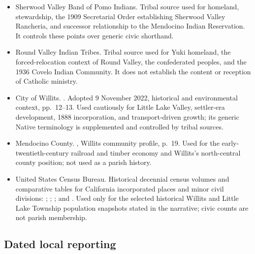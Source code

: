 \begin{itemize}[leftmargin=1.35em,itemsep=0.2em,topsep=0.2em]
\item Sherwood Valley Band of Pomo Indians.  Tribal source used for homeland, stewardship, the 1909 Secretarial Order establishing Sherwood Valley Rancheria, and successor relationship to the Mendocino Indian Reservation. It controls these points over generic civic shorthand.
\item Round Valley Indian Tribes.  Tribal source used for Yuki homeland, the forced-relocation context of Round Valley, the confederated peoples, and the 1936 Covelo Indian Community. It does not establish the content or reception of Catholic ministry.
\item City of Willits. . Adopted 9 November 2022, historical and environmental context, pp.~12--13. Used cautiously for Little Lake Valley, settler-era development, 1888 incorporation, and transport-driven growth; its generic Native terminology is supplemented and controlled by tribal sources.
\item Mendocino County. , Willits community profile, p.~19. Used for the early-twentieth-century railroad and timber economy and Willits's north-central county position; not used as a parish history.
\item United States Census Bureau. Historical decennial census volumes and comparative tables for California incorporated places and minor civil divisions: ; ; ; and . Used only for the selected historical Willits and Little Lake Township population snapshots stated in the narrative; civic counts are not parish membership.
\end{itemize}

\subsection{Dated local reporting}

